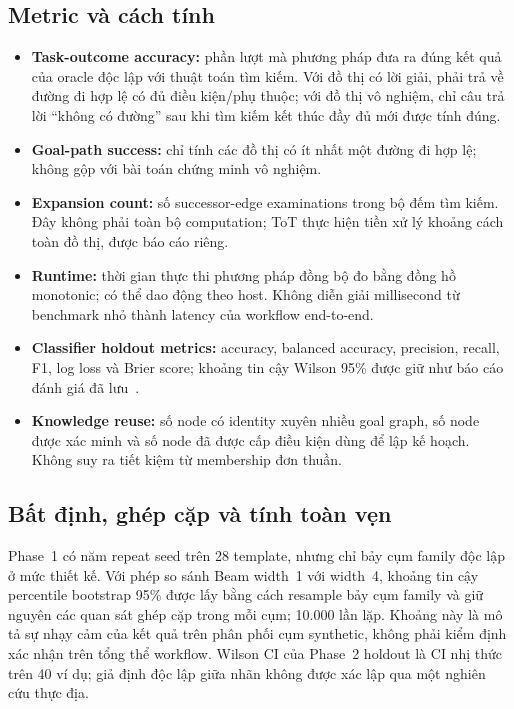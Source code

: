 \documentclass[11pt,a4paper]{article}
\begin{document}
\subsection{Metric và cách tính}
\begin{itemize}
\item \textbf{Task-outcome accuracy:} phần lượt mà phương pháp đưa ra đúng kết quả của oracle độc lập với thuật toán tìm kiếm. Với đồ thị có lời giải, phải trả về đường đi hợp lệ có đủ điều kiện/phụ thuộc; với đồ thị vô nghiệm, chỉ câu trả lời “không có đường” sau khi tìm kiếm kết thúc đầy đủ mới được tính đúng.
\item \textbf{Goal-path success:} chỉ tính các đồ thị có ít nhất một đường đi hợp lệ; không gộp với bài toán chứng minh vô nghiệm.
\item \textbf{Expansion count:} số successor-edge examinations trong bộ đếm tìm kiếm. Đây không phải toàn bộ computation; ToT thực hiện tiền xử lý khoảng cách toàn đồ thị, được báo cáo riêng.
\item \textbf{Runtime:} thời gian thực thi phương pháp đồng bộ đo bằng đồng hồ monotonic; có thể dao động theo host. Không diễn giải millisecond từ benchmark nhỏ thành latency của workflow end-to-end.
\item \textbf{Classifier holdout metrics:} accuracy, balanced accuracy, precision, recall, F1, log loss và Brier score; khoảng tin cậy Wilson 95\% được giữ như báo cáo đánh giá đã lưu \,\cite{newcombe1998wilson}.
\item \textbf{Knowledge reuse:} số node có identity xuyên nhiều goal graph, số node được xác minh và số node đã được cấp điều kiện dùng để lập kế hoạch. Không suy ra tiết kiệm từ membership đơn thuần.
\end{itemize}

\subsection{Bất định, ghép cặp và tính toàn vẹn}
Phase~1 có năm repeat seed trên 28 template, nhưng chỉ bảy cụm family độc lập ở mức thiết kế. Với phép so sánh Beam width~1 với width~4, khoảng tin cậy percentile bootstrap 95\% được lấy bằng cách resample bảy cụm family và giữ nguyên các quan sát ghép cặp trong mỗi cụm; 10.000 lần lặp. Khoảng này là mô tả sự nhạy cảm của kết quả trên phân phối cụm synthetic, không phải kiểm định xác nhận trên tổng thể workflow. Wilson CI của Phase~2 holdout là CI nhị thức trên 40 ví dụ; giả định độc lập giữa nhãn không được xác lập qua một nghiên cứu thực địa.
\end{document}

